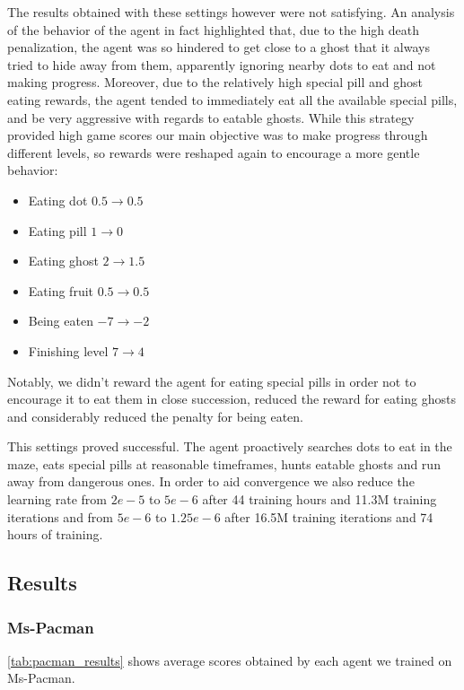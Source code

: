 \documentclass[10pt,twocolumn,letterpaper]{article}
\begin{document}
The results obtained with these settings however were not satisfying. An analysis of the behavior of the agent in fact highlighted that, due to the high death penalization, the agent was so hindered to get close to a ghost that it always tried to hide away from them, apparently ignoring nearby dots to eat and not making progress. Moreover, due to the relatively high special pill and ghost eating rewards, the agent tended to immediately eat all the available special pills, and be very aggressive with regards to eatable ghosts. While this strategy provided high game scores our main objective was to make progress through different levels, so rewards were reshaped again to encourage a more gentle behavior:
\begin{itemize}
	\item Eating dot $0.5 \rightarrow 0.5$
	\item Eating pill $1 \rightarrow 0$
	\item Eating ghost $2 \rightarrow 1.5$
	\item Eating fruit $0.5 \rightarrow 0.5$
	\item Being eaten $-7 \rightarrow -2$
	\item Finishing level $7 \rightarrow 4$
\end{itemize}

Notably, we didn't reward the agent for eating special pills in order not to encourage it to eat them in close succession, reduced the reward for eating ghosts and considerably reduced the penalty for being eaten.

This settings proved successful. The agent proactively searches dots to eat in the maze, eats special pills at reasonable timeframes, hunts eatable ghosts and run away from dangerous ones.
In order to aid convergence we also reduce the learning rate from $2e-5$ to $5e-6$ after 44 training hours and 11.3M training iterations and from $5e-6$ to $1.25e-6$ after 16.5M training iterations and 74 hours of training.

\subsection{Results}

\subsubsection{Ms-Pacman}

\ref{tab:pacman_results} shows average scores obtained by each agent we trained on Ms-Pacman.
\end{document}
